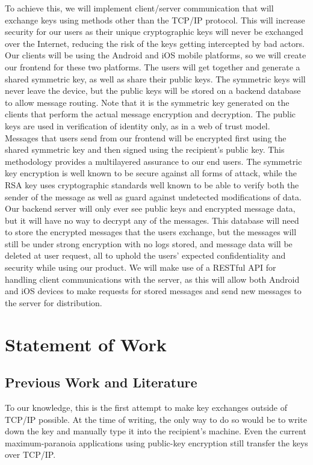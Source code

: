 \documentclass[11pt]{article}
\begin{document}
To achieve this, we will implement client/server communication that will exchange keys using methods other than the TCP/IP protocol. This will increase security for our users as their unique cryptographic keys will never be exchanged over the Internet, reducing the risk of the keys getting intercepted by bad actors. \\

Our clients will be using the Android and iOS mobile platforms, so we will create our frontend for these two platforms. The users will get together and generate a shared symmetric key, as well as share their public keys. The symmetric keys will never leave the device, but the public keys will be stored on a backend database to allow message routing. Note that it is the symmetric key generated on the clients that perform the actual message encryption and decryption. The public keys are used in verification of identity only, as in a web of trust model. \\

Messages that users send from our frontend will be encrypted first using the shared symmetric key and then signed using the recipient’s public key. This methodology provides a multilayered assurance to our end users. The symmetric key encryption is well known to be secure against all forms of attack, while the RSA key uses cryptographic standards well known to be able to verify both the sender of the message as well as guard against undetected modifications of data. \\

Our backend server will only ever see public keys and encrypted message data, but it will have no way to decrypt any of the messages. This database will need to store the encrypted messages that the users exchange, but the messages will still be under strong encryption with no logs stored, and message data will be deleted at user request, all to uphold the users’ expected confidentiality and security while using our product. We will make use of a RESTful API for handling client communications with the server, as this will allow both Android and iOS devices to make requests for stored messages and send new messages to the server for distribution.



\newpage
\section{Statement of Work}
\subsection{Previous Work and Literature}
To our knowledge, this is the first attempt to make key exchanges outside of TCP/IP possible. At the time of writing, the only way to do so would be to write down the key and manually type it into the recipient’s machine. Even the current maximum-paranoia applications using public-key encryption still transfer the keys over TCP/IP. \\
\end{document}
